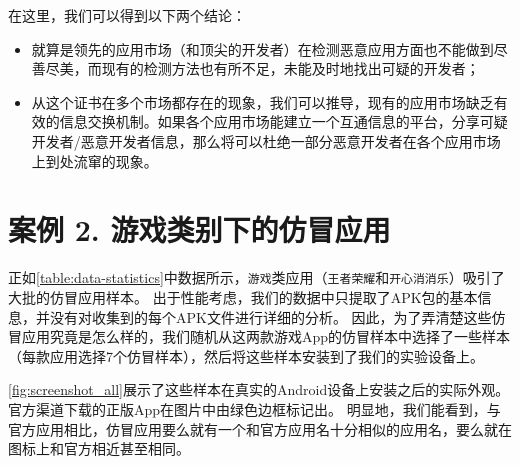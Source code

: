 在这里，我们可以得到以下两个结论：
\begin{itemize}
	\item 就算是领先的应用市场（和顶尖的开发者）在检测恶意应用方面也不能做到尽善尽美，而现有的检测方法也有所不足，未能及时地找出可疑的开发者；
	\item 从这个证书在多个市场都存在的现象，我们可以推导，现有的应用市场缺乏有效的信息交换机制。如果各个应用市场能建立一个互通信息的平台，分享可疑开发者/恶意开发者信息，那么将可以杜绝一部分恶意开发者在各个应用市场上到处流窜的现象。
\end{itemize}

\section{案例 2. 游戏类别下的仿冒应用}

正如\autoref{table:data-statistics}中数据所示，\texttt{游戏}类应用（\texttt{王者荣耀}和\texttt{开心消消乐}）吸引了大批的仿冒应用样本。
出于性能考虑，我们的数据中只提取了APK包的基本信息，并没有对收集到的每个APK文件进行详细的分析。
因此，为了弄清楚这些仿冒应用究竟是怎么样的，我们随机从这两款游戏App的仿冒样本中选择了一些样本（每款应用选择7个仿冒样本），然后将这些样本安装到了我们的实验设备上。

\autoref{fig:screenshot_all}展示了这些样本在真实的Android设备上安装之后的实际外观。
官方渠道下载的正版App在图片中由绿色边框标记出。
明显地，我们能看到，与官方应用相比，仿冒应用要么就有一个和官方应用名十分相似的应用名，要么就在图标上和官方相近甚至相同。

